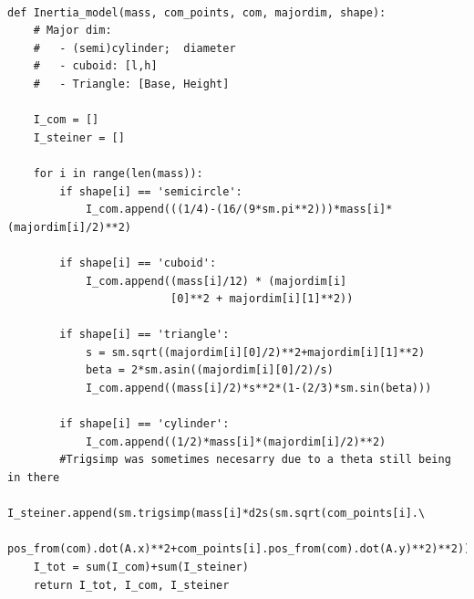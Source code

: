 \begin{verbatim}
    
def Inertia_model(mass, com_points, com, majordim, shape):
    # Major dim:
    #   - (semi)cylinder;  diameter
    #   - cuboid: [l,h]
    #   - Triangle: [Base, Height]

    I_com = []
    I_steiner = []

    for i in range(len(mass)):
        if shape[i] == 'semicircle':
            I_com.append(((1/4)-(16/(9*sm.pi**2)))*mass[i]*(majordim[i]/2)**2)

        if shape[i] == 'cuboid':
            I_com.append((mass[i]/12) * (majordim[i]
                         [0]**2 + majordim[i][1]**2))

        if shape[i] == 'triangle':
            s = sm.sqrt((majordim[i][0]/2)**2+majordim[i][1]**2)
            beta = 2*sm.asin((majordim[i][0]/2)/s)
            I_com.append((mass[i]/2)*s**2*(1-(2/3)*sm.sin(beta)))

        if shape[i] == 'cylinder':
            I_com.append((1/2)*mass[i]*(majordim[i]/2)**2)
        #Trigsimp was sometimes necesarry due to a theta still being in there
        I_steiner.append(sm.trigsimp(mass[i]*d2s(sm.sqrt(com_points[i].\
        pos_from(com).dot(A.x)**2+com_points[i].pos_from(com).dot(A.y)**2)**2)))
    I_tot = sum(I_com)+sum(I_steiner)
    return I_tot, I_com, I_steiner
\end{verbatim}
